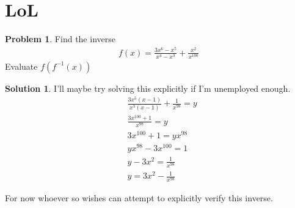 \documentclass[a4paper]{article}
\theoremstyle{definition}
\newtheorem{problem}{Problem}[section]
\newtheorem*{solution}{Solution}
\begin{document}
\section{LoL}
\begin{problem}
Find the inverse
\begin{align*}
f(x) = \frac{3x^6 - x^5}{x^4 -x^3} + \frac{x^2}{x^{100}}
\end{align*}
Evaluate \(f(f^{-1}(x))\)
\end{problem}
\begin{solution}
I'll maybe try solving this explicitly if I'm unemployed enough.
\begin{align*}
&\frac{3x^5(x-1)}{x^3(x-1)} + \frac{1}{x^{98}} = y \\
&\frac{3x^{100} + 1}{x^{98}} = y \\
&3x^{100} + 1 = yx^{98} \\
&yx^{98} -3x^{100} = 1 \\
&y -3x^2 = \frac{1}{x^{98}} \\
&y = 3x^2 -\frac{1}{x^{98}}
\end{align*}

For now whoever so wishes can attempt to explicitly verify this inverse.
\end{solution}
\end{document}
